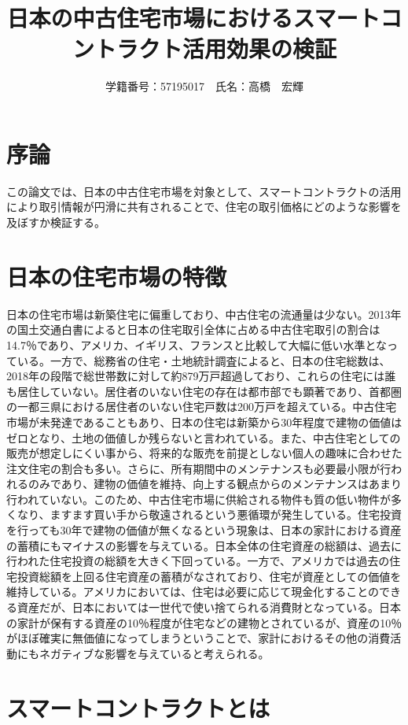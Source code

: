 \documentclass[a4paper,10pt]{bxjsarticle}
\title{日本の中古住宅市場におけるスマートコントラクト活用効果の検証}
\author{学籍番号：57195017　氏名：高橋　宏輝}
\begin{document}
\maketitle

\section{序論}
この論文では、日本の中古住宅市場を対象として、スマートコントラクトの活用により取引情報が円滑に共有されることで、住宅の取引価格にどのような影響を及ぼすか検証する。

\section{日本の住宅市場の特徴}
日本の住宅市場は新築住宅に偏重しており、中古住宅の流通量は少ない。2013年の国土交通白書によると日本の住宅取引全体に占める中古住宅取引の割合は14.7％であり、アメリカ、イギリス、フランスと比較して大幅に低い水準となっている。一方で、総務省の住宅・土地統計調査によると、日本の住宅総数は、2018年の段階で総世帯数に対して約879万戸超過しており、これらの住宅には誰も居住していない。居住者のいない住宅の存在は都市部でも顕著であり、首都圏の一都三県における居住者のいない住宅戸数は200万戸を超えている。中古住宅市場が未発達であることもあり、日本の住宅は新築から30年程度で建物の価値はゼロとなり、土地の価値しか残らないと言われている。また、中古住宅としての販売が想定しにくい事から、将来的な販売を前提としない個人の趣味に合わせた注文住宅の割合も多い。さらに、所有期間中のメンテナンスも必要最小限が行われるのみであり、建物の価値を維持、向上する観点からのメンテナンスはあまり行われていない。このため、中古住宅市場に供給される物件も質の低い物件が多くなり、ますます買い手から敬遠されるという悪循環が発生している。住宅投資を行っても30年で建物の価値が無くなるという現象は、日本の家計における資産の蓄積にもマイナスの影響を与えている。日本全体の住宅資産の総額は、過去に行われた住宅投資の総額を大きく下回っている。一方で、アメリカでは過去の住宅投資総額を上回る住宅資産の蓄積がなされており、住宅が資産としての価値を維持している。アメリカにおいては、住宅は必要に応じて現金化することのできる資産だが、日本においては一世代で使い捨てられる消費財となっている。日本の家計が保有する資産の10％程度が住宅などの建物とされているが、資産の10％がほぼ確実に無価値になってしまうということで、家計におけるその他の消費活動にもネガティブな影響を与えていると考えられる。

\section{スマートコントラクトとは}
\end{document}
